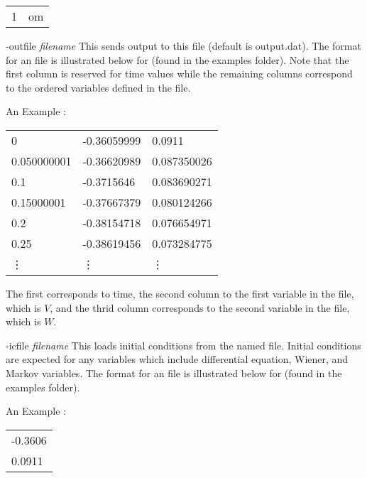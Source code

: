 \begin{description}
\begin{center}
\begin{minipage}{55ex}
\begin{tabular}{ll}
1 & om
\end{tabular}
\end{minipage}
\end{center}
\item{-outfile \emph{filename}} This sends output to this file (default is output.dat).  The format for an {} file is illustrated below for {} (found in the examples {} folder).  Note that the first column is reserved for time values while the remaining columns correspond to the ordered variables defined in the {} file.  
\begin{center}
\begin{minipage}{55ex}
\begin{center}An Example {}:
\end{center}\ttfamily
\begin{tabular}{lll}
0 & -0.36059999 & 0.0911 \\
0.050000001 & -0.36620989 & 0.087350026 \\ 
0.1 & -0.3715646 & 0.083690271 \\
0.15000001 & -0.37667379 & 0.080124266 \\ 
0.2 & -0.38154718 & 0.076654971 \\
0.25 & -0.38619456 & 0.073284775 \\ 
\vdots & \vdots & \vdots\\
\end{tabular}
\end{minipage}
\end{center}
The first corresponds to time, the second column to the first variable in the {} file, which is $V$, and the thrid column corresponds to the second variable in the {} file, which is $W$. 
\item{-icfile \emph{filename}} This loads initial conditions from the named file. Initial conditions are expected for any variables which include differential equation, Wiener, and Markov variables.  The format for an {} file is illustrated below for {} (found in the examples {} folder).  
\begin{center}
\begin{minipage}{55ex}
\begin{center}An Example {}:
\end{center}\ttfamily
\begin{tabular}{l}
-0.3606\\
0.0911 \\

\end{tabular}
\end{minipage}
\end{center}
\end{description}
